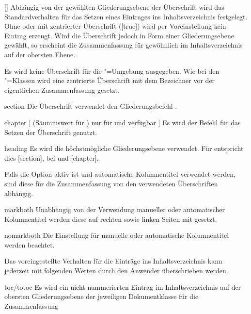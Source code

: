 \begin{Declaration}{[\PSet]}
Abhängig von der gewählten Gliederungsebene der Überschrift wird das 
Standardverhalten für das Setzen eines Eintrages ins Inhaltsverzeichnis 
festgelegt. Ohne oder mit zentrierter Überschrift ([true]) 
wird per Voreinstellung kein Eintrag erzeugt. Wird die Überschrift jedoch in 
Form einer Gliederungsebene gewählt, so erscheint die Zusammenfassung für 
gewöhnlich im Inhaltsverzeichnis auf der obersten Ebene. 
%
\begin{values}
  Es wird keine Überschrift für die "=Umgebung ausgegeben.
  Wie bei den \KOMAScript"=Klassen wird eine zentrierte Überschrift mit dem 
  Bezeichner  vor der eigentlichen Zusammenfassung gesetzt.
\item[section]
  Die Überschrift verwendet den Gliederungsbefehl .
\item[chapter][%
    (Säumniswert für \Class{tudscrbook})
    nur für \Class{tudscrreprt} und \Class{tudscrbook} verfügbar%
  ]
  Es wird der Befehl  für das Setzen der Überschrift genutzt. 
\item[heading]
  Es wird die höchstmögliche Gliederungsebene verwendet. Für 
   entspricht dies [section], bei 
   und  [chapter].
\end{values}
%
Falls die Option  aktiv ist und automatische Kolumnentitel 
verwendet werden, sind diese für die Zusammenfassung von den verwendeten 
Überschriften abhängig.
%
\begin{values}
\item[markboth]
  Unabhängig von der Verwendung manueller oder automatischer Kolumnentitel 
  werden diese auf rechten sowie linken Seiten mit  gesetzt.
\item[nomarkboth]
  Die Einstellung für manuelle oder automatische Kolumnentitel werden beachtet.
\end{values}
%
Das voreingestellte Verhalten für die Einträge ins Inhaltsverzeichnis kann 
jederzeit mit folgenden Werten durch den Anwender überschrieben werden.
%
\begin{values}
\item[toc/totoc]
  Es wird ein nicht nummerierten Eintrag im Inhaltsverzeichnis auf der obersten 
  Gliederungsebene der jeweiligen Dokumentklasse für die Zusammenfassung 

\end{values}
\end{Declaration}
